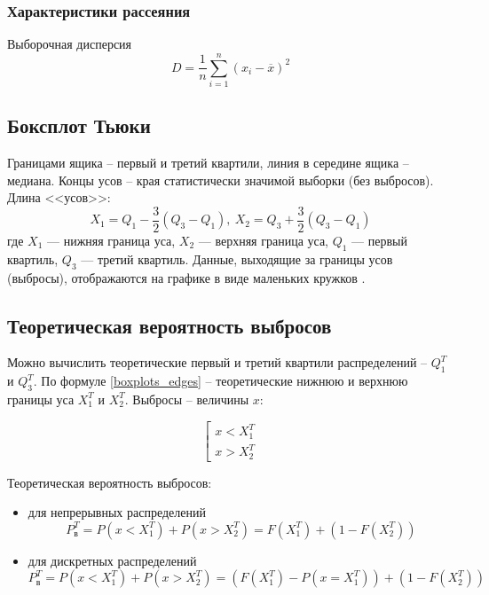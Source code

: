 \documentclass[12pt]{article}
\begin{document}
	\subsubsection{Характеристики рассеяния}
	
	Выборочная дисперсия 
	\begin{equation}
		D = \dfrac{1}{n}\sum\limits_{i=1}^n(x_i-\overline{x})^2
	\end{equation}
	
	\subsection{Боксплот Тьюки}
	
	Границами ящика – первый и третий квартили, линия в середине ящика -- медиана. Концы усов -- края статистически значимой выборки (без выбросов). Длина <<усов>>:
	\begin{equation} \label{boxplots_edges}
		X_1 = Q_1 - \dfrac{3}{2}(Q_3-Q_1),\ X_2 = Q_3 + \dfrac{3}{2}(Q_3-Q_1)
	\end{equation}
	где $X_1$ — нижняя граница уса, $X_2$ — верхняя граница уса, $Q_1$ — первый квартиль, $Q_3$ — третий квартиль. Данные, выходящие за границы усов (выбросы), отображаются на графике в виде маленьких кружков \cite{boxplot}.
	
	\subsection{Теоретическая вероятность выбросов}
	
	Можно вычислить теоретические первый и третий квартили распределений -- $Q_1^T$ и $Q_3^T$. По формуле \eqref{boxplots_edges} – теоретические нижнюю и верхнюю границы уса $X_1^T$ и $X_2^T$. Выбросы -- величины $x$:
	
	\begin{equation}
		\left[
		\begin{gathered}
			x < X_1^T\\
			x > X_2^T
		\end{gathered}\right.
	\end{equation}

	Теоретическая вероятность выбросов:
	\begin{itemize}
		\item для непрерывных распределений
		\begin{equation}
			P_{\text{в}}^T = P(x < X_1^T) + P(x > X_2^T) = F(X_1^T) + \left(1-F(X_2^T)\right)
		\end{equation}
		\item для дискретных распределений
		\begin{equation}
			P_{\text{в}}^T = P(x < X_1^T) + P(x > X_2^T) = \left(F(X_1^T) - P(x = X_1^T)\right) + \left(1-F(X_2^T)\right)
		\end{equation}
	\end{itemize}
	
\end{document}
